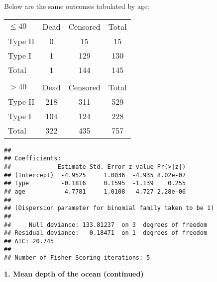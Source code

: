 \documentclass[10pt]{beamer}\usepackage[]{graphicx}\usepackage[]{color}
\makeatletter
\newenvironment{kframe}{%
 \def\at@end@of@kframe{}%
 \ifinner\ifhmode%
  \def\at@end@of@kframe{\end{minipage}}%
  \begin{minipage}{\columnwidth}%
 \fi\fi%
 \def\FrameCommand##1{\hskip\@totalleftmargin \hskip-\fboxsep
 \colorbox{shadecolor}{##1}\hskip-\fboxsep
     \hskip-\linewidth \hskip-\@totalleftmargin \hskip\columnwidth}%
 \MakeFramed {\advance\hsize-\width
   \@totalleftmargin\z@ \linewidth\hsize
   \@setminipage}}%
 {\par\unskip\endMakeFramed%
 \at@end@of@kframe}
\newenvironment{knitrout}{}{} %
\makeatother
\begin{document}
\begin{frame}
	\vspace{-.81in}
\tiny
Below are the same outcomes tabulated by age:

\begin{table}[h]
	\begin{tabular}{lcc|c}
		$\leq 40$ & Dead &  Censored & Total\\
		Type II & 0 & 15 & 15 \\
		Type I & 1 & 129 & 130 \\
		\hline
		Total & 1 & 144 & 145 \\
		& & & \\
		$> 40$ & Dead &  Censored & Total\\
		Type II & 218 & 311 & 529 \\
		Type I & 104 & 124 & 228 \\
		\hline
		Total & 322 & 435 & 757 \\ 
	\end{tabular}
\end{table}

	\vspace{-.21in}
\begin{knitrout}\tiny
{}\color{fgcolor}\begin{kframe}
\begin{verbatim}
## 
## Coefficients:
##             Estimate Std. Error z value Pr(>|z|)
## (Intercept)  -4.9525     1.0036  -4.935 8.02e-07
## type         -0.1816     0.1595  -1.139    0.255
## age           4.7781     1.0108   4.727 2.28e-06
## 
## (Dispersion parameter for binomial family taken to be 1)
## 
##     Null deviance: 133.81237  on 3  degrees of freedom
## Residual deviance:   0.18471  on 1  degrees of freedom
## AIC: 20.745
## 
## Number of Fisher Scoring iterations: 5
\end{verbatim}
\end{kframe}
\end{knitrout}
\end{frame}

\begin{frame}
	\vspace*{-5.0in}
	\textbf{1. Mean depth of the ocean (continued)}
	
\end{frame}
\end{document}
